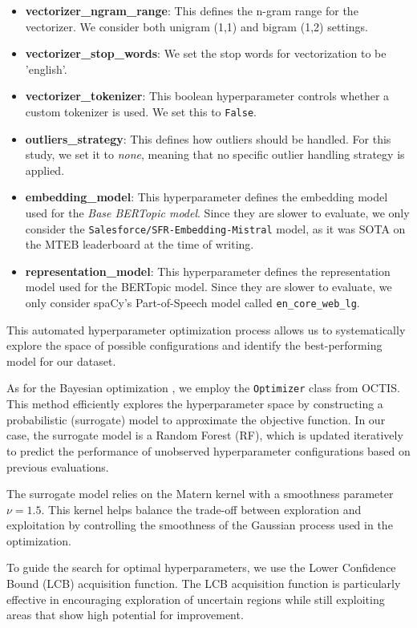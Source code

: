 \begin{itemize}
    \item \textbf{vectorizer\_ngram\_range}: This defines the n-gram range for the vectorizer. We consider both unigram (1,1) and bigram (1,2) settings.
    \item \textbf{vectorizer\_stop\_words}: We set the stop words for vectorization to be 'english'.
    \item \textbf{vectorizer\_tokenizer}: This boolean hyperparameter controls whether a custom tokenizer is used. We set this to \texttt{False}.
    \item \textbf{outliers\_strategy}: This defines how outliers should be handled. For this study, we set it to \textit{none}, meaning that no specific outlier handling strategy is applied.
    \item \textbf{embedding\_model}: This hyperparameter defines the embedding model used for the \textit{Base BERTopic model}. Since they are slower to evaluate, we only consider the \texttt{Salesforce/\allowbreak SFR-Embedding-\allowbreak Mistral} model, as it was SOTA on the MTEB leaderboard \cite{muennighoff_mteb_2023} at the time of writing.
    \item \textbf{representation\_model}: This hyperparameter defines the representation model used for the BERTopic model. Since they are slower to evaluate, we only consider spaCy's Part-of-Speech model called \texttt{en\_core\_web\_lg}.
\end{itemize}

This automated hyperparameter optimization process allows us to systematically explore the space of possible configurations and identify the best-performing model for our dataset.

As for the Bayesian optimization \cite{archetti_bayesian_2019, galuzzi_hyperparameter_2020, snoek_practical_2012}, we employ the \texttt{Optimizer} class from OCTIS. This method efficiently explores the hyperparameter space by constructing a probabilistic (surrogate) model to approximate the objective function. In our case, the surrogate model is a Random Forest (RF), which is updated iteratively to predict the performance of unobserved hyperparameter configurations based on previous evaluations.

The surrogate model relies on the Matern kernel with a smoothness parameter \( \nu = 1.5 \). This kernel helps balance the trade-off between exploration and exploitation by controlling the smoothness of the Gaussian process used in the optimization.

To guide the search for optimal hyperparameters, we use the Lower Confidence Bound (LCB) acquisition function. The LCB acquisition function is particularly effective in encouraging exploration of uncertain regions while still exploiting areas that show high potential for improvement.

